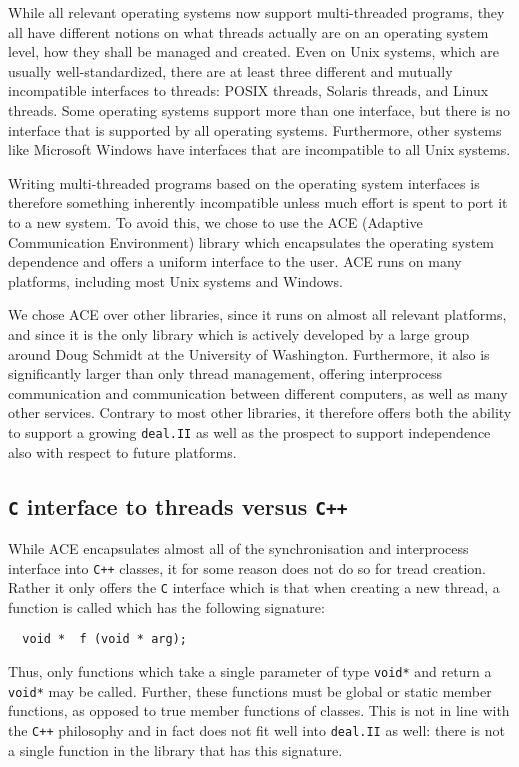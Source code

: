 \documentclass[11pt]{article}
\begin{document}
While all relevant operating systems now support multi-threaded programs, they
all have different notions on what threads actually are on an operating system
level, how they shall be managed and created. Even on Unix systems, which are
usually well-standardized, there are at least three different and mutually
incompatible interfaces to threads: POSIX threads, Solaris threads, and Linux
threads. Some operating systems support more than one interface, but there is
no interface that is supported by all operating systems. Furthermore, other
systems like Microsoft Windows have interfaces that are incompatible to all
Unix systems.

Writing multi-threaded programs based on the operating system interfaces is
therefore something inherently incompatible unless much effort is spent to
port it to a new system. To avoid this, we chose to use the ACE (Adaptive
Communication Environment) library which encapsulates the operating system
dependence and offers a uniform interface to the user. ACE runs on many
platforms, including most Unix systems and Windows. 

We chose ACE over other libraries, since it runs on almost all relevant
platforms, and since it is the only library which is actively developed by a
large group around Doug Schmidt at the University of Washington. Furthermore,
it also is significantly larger than only thread management, offering
interprocess communication and communication between different computers, as
well as many other services. Contrary to most other libraries, it therefore
offers both the ability to support a growing \texttt{deal.II} as well as the
prospect to support independence also with respect to future platforms.


\subsection{\texttt{C} interface to threads versus \texttt{C++}}

While ACE encapsulates almost all of the synchronisation and interprocess
interface into \texttt{C++} classes, it for some reason does not do so for
tread creation. Rather it only offers the \texttt{C} interface which is that
when creating a new thread, a function is called which has the following
signature:
\begin{verbatim}
  void *  f (void * arg);
\end{verbatim}
Thus, only functions which take a single parameter of type \texttt{void*} and
return a \texttt{void*} may be called. Further, these functions must be global
or static member functions, as opposed to true member functions of
classes. This is not in line with the \texttt{C++} philosophy and in fact does
not fit well into \texttt{deal.II} as well: there is not a single function in
the library that has this signature.
\end{document}
